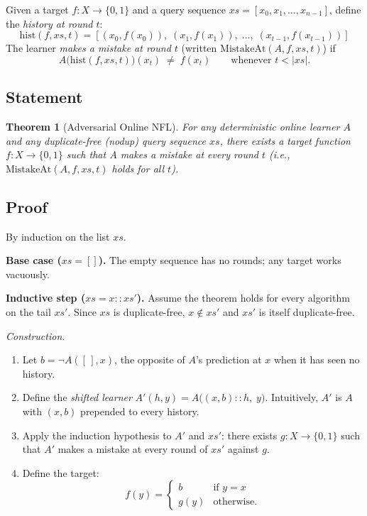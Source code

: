 \documentclass[11pt]{article}
\newtheorem{theorem}{Theorem}[section]
\theoremstyle{remark}
\newcommand{\Bool}{\{0,1\}}
\newcommand{\histTo}{\mathrm{hist}}
\newcommand{\MistakeAt}{\mathrm{MistakeAt}}
\newcommand{\card}[1]{|#1|}
\begin{document}
Given a target $f : X \to \Bool$ and a query sequence
$xs = [x_0, x_1, \ldots, x_{n-1}]$, define the \emph{history at
round $t$}:
\[
  \histTo(f, xs, t) = [(x_0, f(x_0)),\; (x_1, f(x_1)),\; \ldots,\;
    (x_{t-1}, f(x_{t-1}))]
\]
The learner \emph{makes a mistake at round $t$} (written
$\MistakeAt(A, f, xs, t)$) if
\[
  A\!\bigl(\histTo(f, xs, t)\bigr)(x_t) \;\neq\; f(x_t)
  \qquad \text{whenever } t < \card{xs}.
\]

\subsection{Statement}

\begin{theorem}[Adversarial Online NFL]
\label{thm:online}
  For any deterministic online learner $A$ and any
  duplicate-free (\emph{nodup}) query sequence $xs$, there exists a
  target function $f : X \to \Bool$ such that $A$ makes a mistake at
  every round $t$ (i.e., $\MistakeAt(A, f, xs, t)$ holds for all $t$).
\end{theorem}

\subsection{Proof}

By induction on the list $xs$.

\medskip
\noindent\textbf{Base case ($xs = []$).}
The empty sequence has no rounds; any target works vacuously.

\medskip
\noindent\textbf{Inductive step ($xs = x :: xs'$).}
Assume the theorem holds for every algorithm on the tail $xs'$.
Since $xs$ is duplicate-free, $x \notin xs'$ and $xs'$ is itself
duplicate-free.

\medskip
\noindent\emph{Construction.}
\begin{enumerate}
  \item Let $b = \neg A([\,], x)$, the opposite of $A$'s prediction at
        $x$ when it has seen no history.

  \item Define the \emph{shifted learner}
        $A'(h, y) = A\!\bigl((x, b) :: h,\; y\bigr)$.
        Intuitively, $A'$ is $A$ with $(x, b)$ prepended to every
        history.

  \item Apply the induction hypothesis to $A'$ and $xs'$: there exists
        $g : X \to \Bool$ such that $A'$ makes a mistake at every round
        of $xs'$ against $g$.

  \item Define the target:
        \[
          f(y) = \begin{cases} b & \text{if } y = x \\ g(y) &
            \text{otherwise.} \end{cases}
        \]
\end{enumerate}
\end{document}

